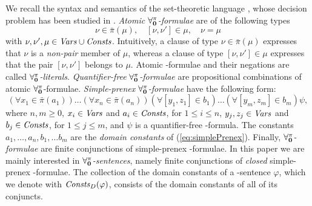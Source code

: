 \documentclass[a4paper]{llncs}
\newcommand{\pairin}[3]{\left[#1,#2\right] \in #3}
\newcommand{\nonpairin}[2]{#1 \in \bar{\pi}(#2)}
\newcommand{\seteq}[2]{#1=#2}
\newcommand{\DomConsts}{\Consts_D}
\begin{document}
We recall the syntax and semantics of the set-theoretic
language \Forallpizero, whose decision problem has been studied in 
\cite{CanLonNic2011}.
\emph{Atomic }$\mathbf{\forall_{0}^{\pi}}$\emph{-formulae} are of the following types
\begin{equation}\label{ATFORM}
    \nonpairin{\nu}{\mu}, \quad \pairin{\nu}{\nu'}{\mu}, \quad \seteq{\nu}{\mu}
\end{equation}
with $\nu, \nu', \mu \in \mathit{Vars} \cup \mathit{Consts}$. Intuitively,
a clause of type $\nonpairin{\nu}{\mu}$
expresses that $\nu$ is a \emph{non-pair} member of $\mu$,
whereas a clause of type $[\nu, \nu'] \in \mu$ expresses
that the pair $[\nu, \nu']$ belongs to $\mu$. Atomic
\Forallpizero-formulae and their negations are called
$\mathbf{\forall_{0}^{\pi}}$\emph{-literals}. \emph{Quantifier-free }
$\mathbf{\forall_{0}^{\pi}}$\emph{-formulae} are propositional combinations of atomic
$\mathbf{\forall_{0}^{\pi}}$-formulae. \emph{Simple-prenex }$\mathbf{\forall_{0}^{\pi}}$\emph{-formulae}
have the following form:
\begin{equation}\label{eq:simplePrenex}
  (\forall \nonpairin{x_1}{a_1})\ldots(\forall 
\nonpairin{x_n}{a_n})(\forall \pairin{y_1}{z_1}{b_1})\ldots(\forall 
\pairin{y_m}{z_m}{b_m})\psi,
\end{equation}
where $n, m \geq 0$, $x_i \in \mathit{Vars}$ and
$a_i \in \mathit{Consts}$, for $1 \leq i \leq n$,
$y_j, z_j \in \mathit{Vars}$ and $b_j \in \mathit{Consts}$, for
$1 \leq j \leq m$, and $\psi$ is a quantifier-free
\Forallpizero-formula. The constants $a_1, \ldots, a_n, b_1, \ldots b_m$
are the \emph{domain constants} of (\ref{eq:simplePrenex}).
Finally, $\mathbf{\forall_{0}^{\pi}}$\emph{-formulae} are finite
conjunctions of simple-prenex \Forallpizero-formulae.
%
In this paper we are mainly interested in 
$\mathbf{\forall_{0}^{\pi}}$\emph{-sentences}, namely finite conjunctions of 
\emph{closed} simple-prenex \Forallpizero-formulae.
The collection of the domain constants of a
\Forallpizero-sentence $\varphi$, which we denote with $\DomConsts(\varphi)$,
consists of the domain constants of all of its conjuncts.
\end{document}
